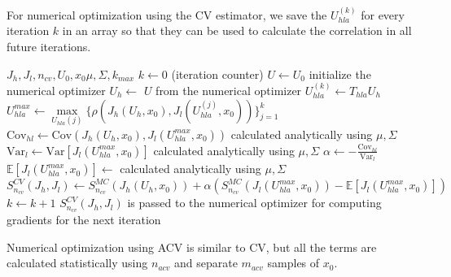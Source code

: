 \documentclass{article}
\begin{document}
For numerical optimization using the CV estimator, we save the $U_{hla}^{(k)}$ for every iteration $k$ in an array
so that they can be used to calculate the correlation in all future iterations.

\begin{algorithm}
  \caption{Numerical optimization with CV estimator}
  \begin{algorithmic}
    \Require $J_h, J_l, n_{cv}, U_0, x_0 \mu, \Sigma, k_{max}$
    \State $k \gets 0$ (iteration counter)
    \State $U \gets U_0$ initialize the numerical optimizer
    \State $U_h \gets$ $U$ from the numerical optimizer
    \State $U_{hla}^{(k)} \gets T_{hla} U_h$
    \State $U_{hla}^{max} \gets \underset{U_{hla}(j)} \max \{\rho(J_h(U_h, x_0), J_l(U_{hla}^{(j)}, x_0))\}_{j=1}^k$
    \State $\text{Cov}_{hl} \gets \text{Cov}(J_h(U_h, x_0), J_l(U_{hla}^{max}, x_0))$ calculated analytically using $\mu, \Sigma$
    \State $\text{Var}_l \gets \text{Var}[J_l(U_{hla}^{max}, x_0)]$ calculated analytically using $\mu, \Sigma$
    \State $\alpha \gets -\frac{\text{Cov}_{hl}}{\text{Var}_l}$
    \State $\mathbb{E}[J_l(U_{hla}^{max}, x_0)] \gets$ calculated analytically using $\mu, \Sigma$
    \State $S_{n_{cv}}^{CV}(J_h, J_l) \gets S_{n_{cv}}^{MC}(J_h(U_h, x_0)) + \alpha (S_{n_{cv}}^{MC}(J_l(U_{hla}^{max}, x_0)) - \mathbb{E}[J_l(U_{hla}^{max}, x_0)])$
    \State $k \gets k + 1$
    \State $S_{n_{cv}}^{CV}(J_h, J_l)$ is passed to the numerical optimizer for computing gradients for the next iteration
    \EndWhile
  \end{algorithmic}
\end{algorithm}

Numerical optimization using ACV is similar to CV, but all the terms are calculated statistically using $n_{acv}$ and separate
$m_{acv}$ samples of $x_0$.
\end{document}
